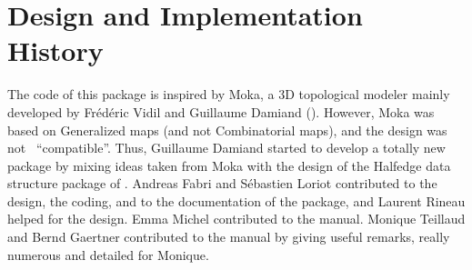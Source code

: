 \section{Design and Implementation History}
%
The code of this package is inspired by Moka, a 3D topological modeler
mainly developed by Fr\'ed\'eric Vidil and Guillaume Damiand
().
However, Moka was based on Generalized maps (and not Combinatorial
maps), and the design was not \cgal\ ``compatible''. Thus, Guillaume
Damiand started to develop a totally new package by mixing ideas taken
from Moka with the design of the Halfedge data structure package of
\cgal.  Andreas Fabri and S\'ebastien Loriot contributed to the
design, the coding, and to the documentation of the package, and
Laurent Rineau helped for the design. Emma Michel contributed to the
manual. Monique Teillaud and Bernd Gaertner contributed to the manual
by giving useful remarks, really numerous and detailed for Monique.

